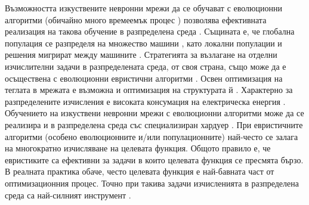 Възможността изкуствените невронни мрежи да се обучават с еволюционни алгоритми (обичайно много времеемък процес \cite{Guo-01}) позволява ефективната реализация на такова обучение в разпределена среда \cite{Pandey-01}. Същината е, че глобална популация се разпределя на множество машини \cite{Plagianakos-01}, като локални популации и решения мигрират между машините \cite{Tan-01}. Стратегията за възлагане на отделни изчислителни задачи в разпределената среда, от своя страна, също може да е осъществена с еволюционни евристични алгоритми \cite{Sharma-01}. Освен оптимизация на теглата в мрежата е възможна и оптимизация на структурата й \cite{Desell-01}. Характерно за разпределените изчисления е високата консумация на електрическа енергия \cite{Foo-01}. Обучението на изкуствени невронни мрежи с еволюционни алгоритми може да се реализира и в разпределена среда със специализиран хардуер \cite{Epitropakis-01}. При евристичните алгоритми (особено еволюционните и/или популационните) най-често се залага на многократно изчисляване на целевата функция. Общото правило е, че евристиките са ефективни за задачи в които целевата функция се пресмята бързо. В реалната практика обаче, често целевата функция е най-бавната част от оптимизационния процес. Точно при такива задачи изчисленията в разпределена среда са най-силният инструмент \cite{Liu-01}.

